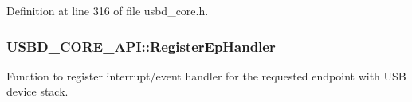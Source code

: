 Definition at line 316 of file usbd\+\_\+core.\+h.

\subsubsection[{\texorpdfstring{Register\+Ep\+Handler}{RegisterEpHandler}}]{ U\+S\+B\+D\+\_\+\+C\+O\+R\+E\+\_\+\+A\+P\+I\+::\+Register\+Ep\+Handler}\hypertarget{structUSBD__CORE__API_aae115addea44c865ee6e474740a9cf80}{}\label{structUSBD__CORE__API_aae115addea44c865ee6e474740a9cf80}
Function to register interrupt/event handler for the requested endpoint with U\+SB device stack.

